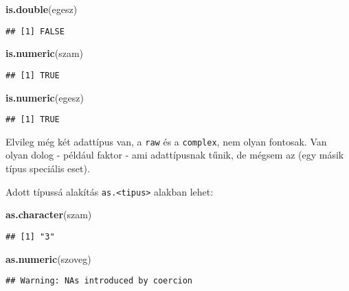 \documentclass[]{book}
\newenvironment{Shaded}{\begin{snugshade}}{\end{snugshade}}
\newcommand{\KeywordTok}[1]{\textcolor[rgb]{0.13,0.29,0.53}{\textbf{#1}}}
\newcommand{\NormalTok}[1]{#1}
\begin{document}
\begin{Shaded}
\begin{Highlighting}[]
\KeywordTok{is.double}\NormalTok{(egesz)}
\end{Highlighting}
\end{Shaded}

\begin{verbatim}
## [1] FALSE
\end{verbatim}

\begin{Shaded}
\begin{Highlighting}[]
\KeywordTok{is.numeric}\NormalTok{(szam)}
\end{Highlighting}
\end{Shaded}

\begin{verbatim}
## [1] TRUE
\end{verbatim}

\begin{Shaded}
\begin{Highlighting}[]
\KeywordTok{is.numeric}\NormalTok{(egesz)}
\end{Highlighting}
\end{Shaded}

\begin{verbatim}
## [1] TRUE
\end{verbatim}

Elvileg még két adattípus van, a \texttt{raw} és a \texttt{complex}, nem
olyan fontosak. Van olyan dolog - például faktor - ami adattípusnak
tűnik, de mégsem az (egy másik típus speciális eset).

Adott típussá alakítás \texttt{as.\textless{}tipus\textgreater{}}
alakban lehet:

\begin{Shaded}
\begin{Highlighting}[]
\KeywordTok{as.character}\NormalTok{(szam)}
\end{Highlighting}
\end{Shaded}

\begin{verbatim}
## [1] "3"
\end{verbatim}

\begin{Shaded}
\begin{Highlighting}[]
\KeywordTok{as.numeric}\NormalTok{(szoveg)}
\end{Highlighting}
\end{Shaded}

\begin{verbatim}
## Warning: NAs introduced by coercion
\end{verbatim}
\end{document}
